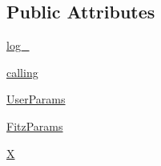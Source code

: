 \subsection*{Public Attributes}
\begin{DoxyCompactItemize}
\item 
\hyperlink{classpyneb_1_1extinction_1_1red__corr_1_1_red_corr_a712aff76d06f15896ed30e689103f66d}{log\-\_\-}
\item 
\hyperlink{classpyneb_1_1extinction_1_1red__corr_1_1_red_corr_a30606dfd94b4cefefd10dbb1f7cbd473}{calling}
\item 
\hyperlink{classpyneb_1_1extinction_1_1red__corr_1_1_red_corr_a7e1e251a6bd48ed36428c4654af46606}{User\-Params}
\item 
\hyperlink{classpyneb_1_1extinction_1_1red__corr_1_1_red_corr_a133fcc7513d358e629266b24cbe7bebc}{Fitz\-Params}
\item 
\hyperlink{classpyneb_1_1extinction_1_1red__corr_1_1_red_corr_aac92bb80311cda78c01e61aa44655251}{X}
\end{DoxyCompactItemize}
